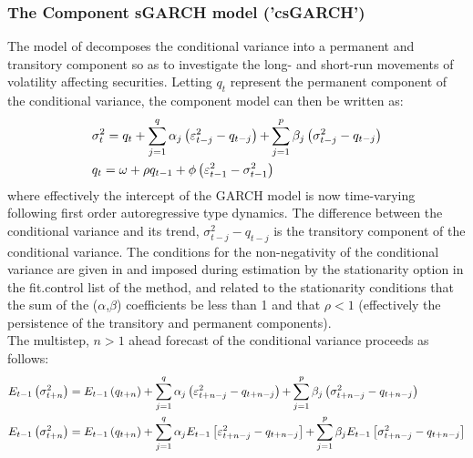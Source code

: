\subsubsection{The Component sGARCH model ('csGARCH')}\label{section:csgarch}
The model of \cite{Lee1999} decomposes the conditional variance into a
permanent and transitory component so as to investigate the long- and short-run
movements of volatility affecting securities. Letting $q_t$ represent the permanent
component of the conditional variance, the component model can then be written
as:
\begin{equation}
\begin{gathered}
  \sigma _t^2 = {q_t} + \sum\limits_{j = 1}^q {{\alpha _j}\left( {\varepsilon _{t - j}^2 - {q_{t - j}}} \right) + } \sum\limits_{j = 1}^p {{\beta _j}\left( {\sigma _{t - j}^2 - {q_{t - j}}} \right)}  \hfill \\
  {q_t} = \omega  + \rho {q_{t - 1}} + \phi \left( {\varepsilon _{t - 1}^2 - \sigma _{t - 1}^2} \right) \hfill \\
\end{gathered}
\end{equation}
where effectively the intercept of the GARCH model is now time-varying
following first order autoregressive type dynamics. The difference between
the conditional variance and its trend, $\sigma_{t - j}^2 - q_{t-j}$ is the
transitory component of the conditional variance. The conditions for the
non-negativity of the conditional variance are given in \cite{Lee1999} and
imposed during estimation by the stationarity option in the fit.control list
of the \verb@ugarchfit@ method, and related to the stationarity conditions
that the sum of the ($\alpha$,$\beta$) coefficients be less than 1 and that $\rho<1$
(effectively the persistence of the transitory and permanent components).\\
The multistep, $n>1$ ahead forecast of the conditional variance proceeds as follows:
\begin{equation}
\begin{gathered}
  {E_{t - 1}}\left( {\sigma _{t + n}^2} \right) = {E_{t - 1}}\left( {{q_{t + n}}} \right) + \sum\limits_{j = 1}^q {{\alpha _j}\left( {\varepsilon _{t + n - j}^2 - {q_{t + n - j}}} \right) + } \sum\limits_{j = 1}^p {{\beta _j}\left( {\sigma _{t + n - j}^2 - {q_{t + n - j}}} \right)}  \hfill \\
  {E_{t - 1}}\left( {\sigma _{t + n}^2} \right) = {E_{t - 1}}\left( {{q_{t + n}}} \right) + \sum\limits_{j = 1}^q {{\alpha _j}{E_{t - 1}}\left[ {\varepsilon _{t + n - j}^2 - {q_{t + n - j}}} \right] + } \sum\limits_{j = 1}^p {{\beta _j}{E_{t - 1}}\left[ {\sigma _{t + n - j}^2 - {q_{t + n - j}}} \right]}  \hfill \\
\end{gathered}
\end{equation}
